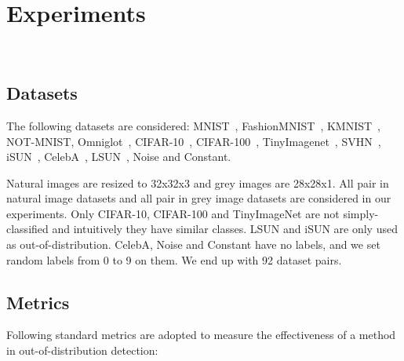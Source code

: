 \documentclass[a3paper]{article}
\begin{document}
\section{Experiments}~\label{app:b}

\subsection{Datasets}
The following datasets are considered: MNIST~\cite{lecun1998gradient}, FashionMNIST~\cite{xiao2017/online}, KMNIST~\cite{clanuwat2018deep}, NOT-MNIST, Omniglot~\cite{lake2015human}, CIFAR-10~\cite{krizhevsky2009learning}, CIFAR-100~\cite{krizhevsky2009learning}, TinyImagenet~\cite{deng2009imagenet}, SVHN~\cite{netzer2011reading}, iSUN~\cite{xu2015turkergaze}, CelebA~\cite{liu2015deep}, LSUN~\cite{yu2015lsun}, Noise and Constant.

Natural images are resized to 32x32x3 and grey images are 28x28x1. All pair in natural image datasets and all pair in grey image datasets are considered in our experiments. Only CIFAR-10, CIFAR-100 and TinyImageNet are not simply-classified and intuitively they have similar classes. LSUN and iSUN are only used as out-of-distribution. CelebA, Noise and Constant have no labels, and we set random labels from 0 to 9 on them. We end up with 92 dataset pairs.

\subsection{Metrics}
Following standard metrics are adopted to measure the effectiveness of a method in out-of-distribution detection:
\end{document}
